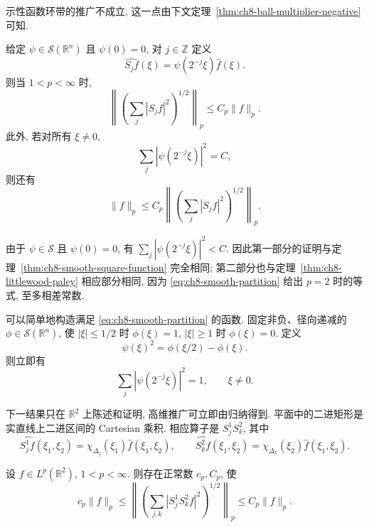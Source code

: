 \hypertarget{chapter-08-page-174}{}
示性函数环带的推广不成立, 这一点由下文定理~\ref{thm:ch8-ball-multiplier-negative} 可知.

\begin{Theorem}
\label{thm:ch8-smooth-square-rn}
给定 $\psi\in\mathcal S(\mathbb R^n)$ 且 $\psi(0)=0$, 对 $j\in\mathbb Z$ 定义
\[
 \widehat{S_jf}(\xi)=\psi(2^{-j}\xi)\widehat f(\xi).
\]
则当 $1<p<\infty$ 时,
\begin{equation}
\label{eq:ch8-smooth-square-rn}
 \left\|\left(\sum_j|S_jf|^2\right)^{1/2}\right\|_p
 \le C_p\|f\|_p.
\end{equation}
此外, 若对所有 $\xi\ne0$,
\begin{equation}
\label{eq:ch8-smooth-partition}
 \sum_j|\psi(2^{-j}\xi)|^2=C,
\end{equation}
则还有
\begin{equation}
\label{eq:ch8-smooth-square-rn-lower}
 \|f\|_p\le C_p
 \left\|\left(\sum_j|S_jf|^2\right)^{1/2}\right\|_p.
\end{equation}
\end{Theorem}

由于 $\psi\in\mathcal S$ 且 $\psi(0)=0$, 有 $\sum_j|\psi(2^{-j}\xi)|^2<C$. 因此第一部分的证明与定理~\ref{thm:ch8-smooth-square-function} 完全相同; 第二部分也与定理~\ref{thm:ch8-littlewood-paley} 相应部分相同, 因为 \eqref{eq:ch8-smooth-partition} 给出 $p=2$ 时的等式, 至多相差常数.

可以简单地构造满足 \eqref{eq:ch8-smooth-partition} 的函数. 固定非负、径向递减的 $\phi\in\mathcal S(\mathbb R^n)$, 使 $|\xi|\le1/2$ 时 $\phi(\xi)=1$, $|\xi|\ge1$ 时 $\phi(\xi)=0$. 定义
\[
 \psi(\xi)^2=\phi(\xi/2)-\phi(\xi).
\]
则立即有
\[
 \sum_j|\psi(2^{-j}\xi)|^2=1,
 \qquad\xi\ne0.
\]

下一结果只在 $\mathbb R^2$ 上陈述和证明, 高维推广可立即由归纳得到. 平面中的二进矩形是实直线上二进区间的 Cartesian 乘积. 相应算子是 $S_j^1S_k^2$, 其中
\[
 \widehat{S_j^1f}(\xi_1,\xi_2)=\chi_{\Delta_j}(\xi_1)\widehat f(\xi_1,\xi_2),
 \qquad
 \widehat{S_k^2f}(\xi_1,\xi_2)=\chi_{\Delta_k}(\xi_2)\widehat f(\xi_1,\xi_2).
\]

\hypertarget{chapter-08-page-175}{}
\begin{Theorem}
\label{thm:ch8-product-littlewood-paley}
设 $f\in L^p(\mathbb R^2)$, $1<p<\infty$. 则存在正常数 $c_p,C_p$, 使
\[
 c_p\|f\|_p
 \le\left\|\left(\sum_{j,k}|S_j^1S_k^2f|^2\right)^{1/2}\right\|_p
 \le C_p\|f\|_p.
\]
\end{Theorem}

